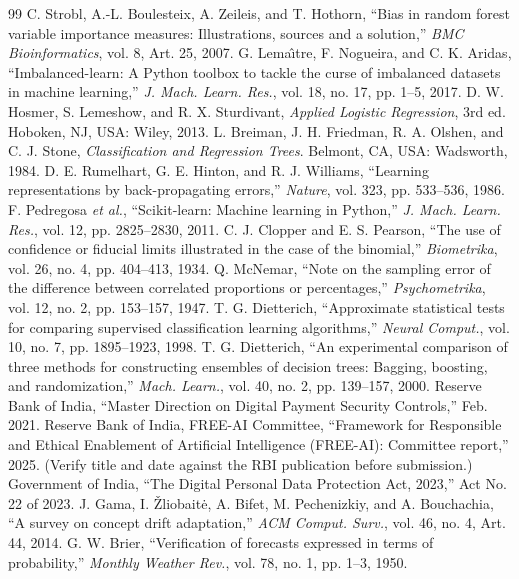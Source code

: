 \documentclass[conference]{IEEEtran}
\begin{document}
\begin{thebibliography}{99}
 C. Strobl, A.-L. Boulesteix, A. Zeileis, and T. Hothorn, ``Bias in random forest variable importance measures: Illustrations, sources and a solution,'' \emph{BMC Bioinformatics}, vol. 8, Art. 25, 2007.
 G. Lema\^{\i}tre, F. Nogueira, and C. K. Aridas, ``Imbalanced-learn: A Python toolbox to tackle the curse of imbalanced datasets in machine learning,'' \emph{J. Mach. Learn. Res.}, vol. 18, no. 17, pp. 1--5, 2017.
 D. W. Hosmer, S. Lemeshow, and R. X. Sturdivant, \emph{Applied Logistic Regression}, 3rd ed. Hoboken, NJ, USA: Wiley, 2013.
 L. Breiman, J. H. Friedman, R. A. Olshen, and C. J. Stone, \emph{Classification and Regression Trees}. Belmont, CA, USA: Wadsworth, 1984.
 D. E. Rumelhart, G. E. Hinton, and R. J. Williams, ``Learning representations by back-propagating errors,'' \emph{Nature}, vol. 323, pp. 533--536, 1986.
 F. Pedregosa \emph{et al.}, ``Scikit-learn: Machine learning in Python,'' \emph{J. Mach. Learn. Res.}, vol. 12, pp. 2825--2830, 2011.
 C. J. Clopper and E. S. Pearson, ``The use of confidence or fiducial limits illustrated in the case of the binomial,'' \emph{Biometrika}, vol. 26, no. 4, pp. 404--413, 1934.
 Q. McNemar, ``Note on the sampling error of the difference between correlated proportions or percentages,'' \emph{Psychometrika}, vol. 12, no. 2, pp. 153--157, 1947.
 T. G. Dietterich, ``Approximate statistical tests for comparing supervised classification learning algorithms,'' \emph{Neural Comput.}, vol. 10, no. 7, pp. 1895--1923, 1998.
 T. G. Dietterich, ``An experimental comparison of three methods for constructing ensembles of decision trees: Bagging, boosting, and randomization,'' \emph{Mach. Learn.}, vol. 40, no. 2, pp. 139--157, 2000.
 Reserve Bank of India, ``Master Direction on Digital Payment Security Controls,'' Feb. 2021.
 Reserve Bank of India, FREE-AI Committee, ``Framework for Responsible and Ethical Enablement of Artificial Intelligence (FREE-AI): Committee report,'' 2025. (Verify title and date against the RBI publication before submission.)
 Government of India, ``The Digital Personal Data Protection Act, 2023,'' Act No. 22 of 2023.
 J. Gama, I. \v{Z}liobait\.{e}, A. Bifet, M. Pechenizkiy, and A. Bouchachia, ``A survey on concept drift adaptation,'' \emph{ACM Comput. Surv.}, vol. 46, no. 4, Art. 44, 2014.
 G. W. Brier, ``Verification of forecasts expressed in terms of probability,'' \emph{Monthly Weather Rev.}, vol. 78, no. 1, pp. 1--3, 1950.

\end{thebibliography}
\end{document}
